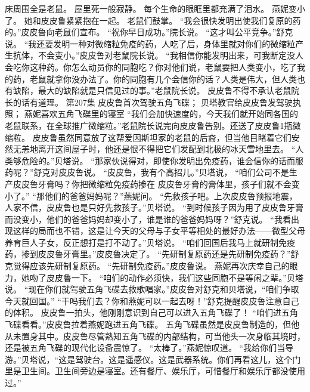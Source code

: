 \documentclass[a4paper,12pt,UTF8,twoside]{ctexbook}
\begin{document}
        床周围全是老鼠。  
        屋里死一般寂静。  
        每个生命的眼眶里都充满了泪水。  
        燕妮变小了。  
        她和皮皮鲁紧紧抱在一起。  
        老鼠们鼓掌。  
        “我会很快发明出使我们复原的药的。”皮皮鲁向老鼠们宣布。  
        “祝你早日成功。”院长说。  
        “这才叫公平竞争。”舒克说。  
        “我还要发明一种对微缩粒免疫的药，人吃了后，身体里就对你们的微缩粒产生抗体，不会变小。”皮皮鲁对老鼠院长说。  
        “我相信你能发明出来，可我断定没人会吃你这种药。你怎么动员你的同胞吃？你对他们说，老鼠要把人类变小，吃了我的药，老鼠就拿你没办法了。你的同胞有几个会信你的话？人类是伟大，但人类也有缺陷，最大的缺陷就是只信见过的事。”老鼠院长说。  
        皮皮鲁不得不承认老鼠院长的话有道理。          第207集  
        皮皮鲁首次驾驶五角飞碟；  
        贝塔教官给皮皮鲁发驾驶执照；  
        燕妮喜欢五角飞碟里的寝室    
        “我们会加快速度的，今天我们就开始同各国的老鼠联系，在全球推广微缩粒。”老鼠院长说完向皮皮鲁告别。还送了皮皮鲁1瓶微缩粒。  
        皮皮鲁虽然同意放了这帮爱因斯坦家的老鼠的后裔，但当他目睹着它们安然无恙地离开这间屋子时，他还是恨不得把它们发配到北极的冰天雪地里去。  
        “人类够危险的。”贝塔说。  
        “那家伙说得对，即使你发明出免疫药，谁会信你的话而服药呢？”舒克对皮皮鲁说。  
        “皮皮鲁，我有个高招儿。”贝塔说，  “咱们公司不是生产皮皮鲁牙膏吗？你把微缩粒免疫药掺在        皮皮鲁牙膏的膏体里，孩子们就不会变小了。”  
        “那他们的爸爸妈妈呢？”燕妮问。  
        “先救孩子吧。上次皮皮鲁预报地震，人家不信，皮皮鲁也是只好先救孩子。”贝塔说。  
        “到时候孩子因为用了皮皮鲁牙膏而没变小，他们的爸爸妈妈却变小了，谁是谁的爸爸妈妈呀？”舒克说。  
        “我看出现这样的局而也不错，这是让今天的父母与子女平等相处的最好办法——微型父母养育巨人子女，反正想打是打不动了。”贝塔说。  
        “咱们回国后我马上就研制免疫药，掺到皮皮鲁牙膏里。”皮皮鲁决定了。  
        “先研制复原药还是先研制免疫药？”舒克觉得应该先研制复原药。  
        “先研制免疫药。”皮皮鲁说。  
        燕妮再次庆幸自己的眼力，她吻了皮皮鲁一下。  
        “咱们的动作必须快，我们这些同胞不是等闲之辈。”贝塔说。  
        “现在你们就驾驶五角飞碟去救歌唱家。”皮皮鲁对舒克和贝塔说，“咱们争取今天就回国。”  
        “干吗我们去？你和燕妮可以一起去呀！”舒克提醒皮皮鲁注意自己的体积。  
        皮皮鲁一拍头，他刚刚意识到自己可以进入五角飞碟了！        
        “咱们进五角飞碟看看。”皮皮鲁拉着燕妮跑进五角飞碟。  
        五角飞碟虽然是皮皮鲁制造的，但他从未置身其中。皮皮鲁尽管熟知五角飞碟的内部结构，可当他头一次身临其境时，还是被五角飞碟的现代化设备震惊了。  
        “太棒了。”燕妮惊叹道。  
        “我给你们当导游。”贝塔说，“这是驾驶台。这是遥感仪。这是武器系统。你们再看这儿，这个门里是卫生间。卫生间旁边是寝室。还有餐厅、娱乐厅，可惜餐厅和娱乐厅都没使用过。”  
\end{document}
